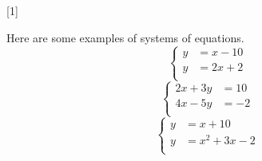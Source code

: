 



\renewcommand{\thechapter}{4} 
\renewcommand{\myCurrentChapterTitle}{Systems of Equations}

[1]

\begin{myObjectives}
\end{myObjectives}

\begin{myVocabulary}
\end{myVocabulary}

Here are some examples of systems of equations.
\begin{equation*}
    \begin{cases}
        y &= x - 10 \\
        y &= 2x + 2 \\
    \end{cases}
\end{equation*}
\begin{equation*}
    \begin{cases}
        2x + 3y &= 10 \\
        4x - 5y &= -2 \\
    \end{cases}
\end{equation*}
\begin{equation*}
    \begin{cases}
       y &= x + 10 \\
       y &= x^2 + 3x -2 \\
    \end{cases}
\end{equation*}



